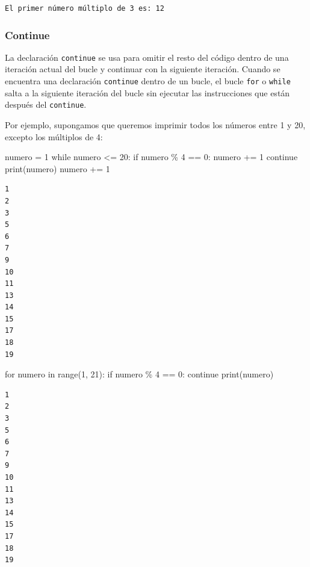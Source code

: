\documentclass[
  letterpaper,
  DIV=11,
  numbers=noendperiod]{scrreprt}
\newenvironment{Shaded}{\begin{snugshade}}{\end{snugshade}}
\newcommand{\BuiltInTok}[1]{\textcolor[rgb]{0.00,0.23,0.31}{#1}}
\newcommand{\ControlFlowTok}[1]{\textcolor[rgb]{0.00,0.23,0.31}{#1}}
\newcommand{\DecValTok}[1]{\textcolor[rgb]{0.68,0.00,0.00}{#1}}
\newcommand{\KeywordTok}[1]{\textcolor[rgb]{0.00,0.23,0.31}{#1}}
\newcommand{\NormalTok}[1]{\textcolor[rgb]{0.00,0.23,0.31}{#1}}
\newcommand{\OperatorTok}[1]{\textcolor[rgb]{0.37,0.37,0.37}{#1}}
\begin{document}
\begin{verbatim}
El primer número múltiplo de 3 es: 12
\end{verbatim}

\subsubsection{Continue}\label{continue}

La declaración \texttt{continue} se usa para omitir el resto del código
dentro de una iteración actual del bucle y continuar con la siguiente
iteración. Cuando se encuentra una declaración \texttt{continue} dentro
de un bucle, el bucle \texttt{for} o \texttt{while} salta a la siguiente
iteración del bucle sin ejecutar las instrucciones que están después del
\texttt{continue}.

Por ejemplo, supongamos que queremos imprimir todos los números entre 1
y 20, excepto los múltiplos de 4:

\begin{Shaded}
\begin{Highlighting}[]
\NormalTok{numero }\OperatorTok{=} \DecValTok{1}
\ControlFlowTok{while}\NormalTok{ numero }\OperatorTok{\textless{}=} \DecValTok{20}\NormalTok{:}
  \ControlFlowTok{if}\NormalTok{ numero }\OperatorTok{\%} \DecValTok{4} \OperatorTok{==} \DecValTok{0}\NormalTok{:}
\NormalTok{      numero }\OperatorTok{+=} \DecValTok{1}
      \ControlFlowTok{continue}
  \BuiltInTok{print}\NormalTok{(numero)}
\NormalTok{  numero }\OperatorTok{+=} \DecValTok{1}
\end{Highlighting}
\end{Shaded}

\begin{verbatim}
1
2
3
5
6
7
9
10
11
13
14
15
17
18
19
\end{verbatim}

\begin{Shaded}
\begin{Highlighting}[]
\ControlFlowTok{for}\NormalTok{ numero }\KeywordTok{in} \BuiltInTok{range}\NormalTok{(}\DecValTok{1}\NormalTok{, }\DecValTok{21}\NormalTok{):}
  \ControlFlowTok{if}\NormalTok{ numero }\OperatorTok{\%} \DecValTok{4} \OperatorTok{==} \DecValTok{0}\NormalTok{:}
      \ControlFlowTok{continue}
  \BuiltInTok{print}\NormalTok{(numero)}
\end{Highlighting}
\end{Shaded}

\begin{verbatim}
1
2
3
5
6
7
9
10
11
13
14
15
17
18
19
\end{verbatim}
\end{document}
